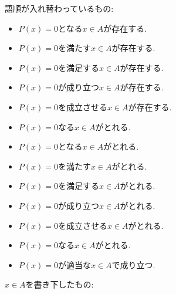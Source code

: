 \documentclass[a4paper,12pt,draft]{amsart}
\begin{document}
語順が入れ替わっているもの:
\begin{itemize}
\item $P(x)=0$となる$x\in A$が存在する.
\item $P(x)=0$を満たす$x\in A$が存在する.
\item $P(x)=0$を満足する$x\in A$が存在する.
\item $P(x)=0$が成り立つ$x\in A$が存在する.
\item $P(x)=0$を成立させる$x\in A$が存在する.
\item $P(x)=0$なる$x\in A$がとれる.
\item $P(x)=0$となる$x\in A$がとれる.
\item $P(x)=0$を満たす$x\in A$がとれる.
\item $P(x)=0$を満足する$x\in A$がとれる.
\item $P(x)=0$が成り立つ$x\in A$がとれる.
\item $P(x)=0$を成立させる$x\in A$がとれる.
\item $P(x)=0$なる$x\in A$がとれる.
\item $P(x)=0$が適当な$x\in A$で成り立つ.
\end{itemize}
$x\in A$を書き下したもの:
\end{document}
